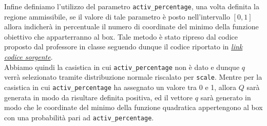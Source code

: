 \documentclass[12pt]{extarticle}
\begin{document}
Infine definiamo l'utilizzo del parametro \texttt{activ\_percentage}, una volta definita la regione ammissibile, se il valore di tale parametro è posto nell'intervallo $[0, 1]$ allora indicherà in percentuale il numero di coordinate del minimo della funzione obiettivo che apparterranno al box. Tale metodo è stato ripreso dal codice proposto dal professore in classe seguendo dunque il codice riportato in \href{https://elearning.di.unipi.it/pluginfile.php/47170/mod_resource/content/2/genBCQP.m}{\textit{link codice sorgente}}.\\
Abbiamo quindi la casistica in cui \texttt{activ\_percentage} non è dato e dunque $q$ verrà selezionato tramite distribuzione normale riscalato per \texttt{scale}.
Mentre per la casistica in cui \texttt{activ\_percentage} ha assegnato un valore tra 0 e 1, allora $Q$ sarà generata in modo da risultare definita positiva, ed il vettore $q$ sarà generato in modo che le coordinate del minimo della funzione quadratica appertengono al box con una probabilità pari ad \texttt{activ\_percentage}.
\end{document}
